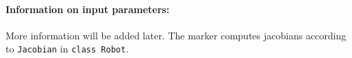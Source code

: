 \paragraph{Information on input parameters:} 
\finishTable
 \noindent
    More information will be added later. The marker computes jacobians according to \texttt{Jacobian} in \texttt{class Robot}.
